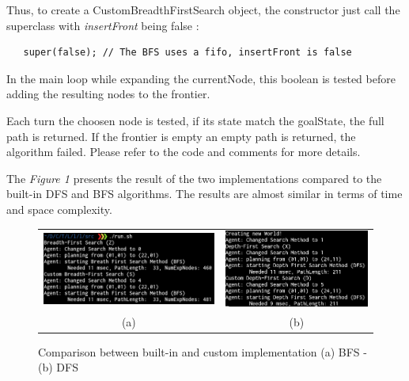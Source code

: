 Thus, to create a CustomBreadthFirstSearch object, the constructor just call the
superclass with \textit{insertFront} being false :
\begin{verbatim}
   super(false); // The BFS uses a fifo, insertFront is false
\end{verbatim}

In the main loop while expanding the currentNode, this boolean is tested before
adding the resulting nodes to the frontier.

Each turn the choosen node is tested, if its state match the goalState, the
full path is returned. If the frontier is empty an empty path is returned, the
algorithm failed. Please refer to the code and comments for more details.

The \textit{Figure 1} presents the result of the two implementations compared
to the built-in DFS and BFS algorithms. The results are almost similar in terms of
time and space complexity.

\begin{figure}[h]
    \centering
    \begin{tabular}{cc}
      \includegraphics[width=.46\linewidth,scale=1]{./images/lab2_bfs.png} & \includegraphics[width=.36\linewidth, scale=1.5]{./images/lab2_dfs.png} \\
      \hspace{0.5cm} (a) & \hspace{0.5cm} (b)
    \end{tabular}
    \caption{Comparison between built-in and custom implementation (a) BFS - (b) DFS \label{fig:BFS and DFS}}
\end{figure}


\newpage
\thispagestyle{empty}
